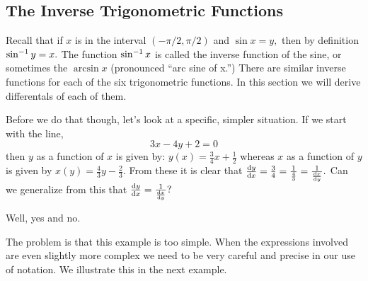 \subsection{The Inverse Trigonometric Functions}
\label{subsec:inverse-trig-funct}
Recall that if $x$ is in the interval $(-\pi/2,\pi/2)$ and  $\sin x =
y,$ then by definition 
$\sin^{-1} y = x.$ The function $\sin^{-1} x$ is called the
inverse function of the sine, or sometimes the $\arcsin x$ (pronounced
``arc sine of x.'') There are similar inverse functions for each of
the six trigonometric functions. In this section we will derive
differentals  of each of them.


Before we do that though, let's look at a specific, simpler situation. If we
start with the line, 
\[
3x-4y+2=0
\]
then $y$ as a function of $x$ is given by: $y(x) = \frac34x+\frac12$
whereas $x$ as a function of $y$ is given by $x(y) =
\frac43y-\frac23.$
From these it is clear that $\frac{\text{d}{y}}{\text{d}{x}} = \frac34 =
\frac{1}{\frac43}=\frac{1}{\frac{\text{d}{x}}{\text{d}{y}}}.$ Can we generalize from this
that $\frac{\text{d}{y}}{\text{d}{x}} = \frac{1}{\frac{\text{d}{x}}{\text{d}{y}}}?$

Well, yes and no.

The problem is that this example is too simple. When the expressions
involved are even slightly more complex we need to be very careful and
precise in our use of notation. We illustrate this in the next
example.

